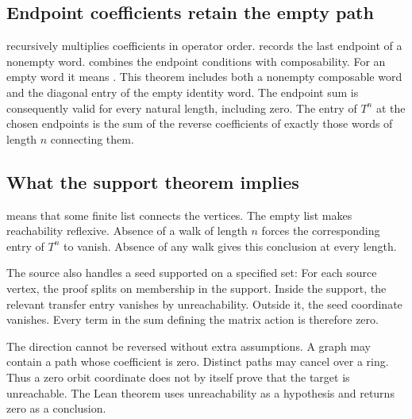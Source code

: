 \subsection{Endpoint coefficients retain the empty path}
 recursively multiplies coefficients in operator order.  records the last endpoint of a nonempty word.  combines the endpoint conditions with composability. For an empty word it means .
This theorem includes both a nonempty composable word and the diagonal entry of the empty identity word. The endpoint sum is consequently valid for every natural length, including zero. The entry of $T^n$ at the chosen endpoints is the sum of the reverse coefficients of exactly those words of length $n$ connecting them.

\subsection{What the support theorem implies}
 means that some finite list connects the vertices. The empty list makes reachability reflexive. Absence of a walk of length $n$ forces the corresponding entry of $T^n$ to vanish. Absence of any walk gives this conclusion at every length.

The source also handles a seed supported on a specified set:
For each source vertex, the proof splits on membership in the support. Inside the support, the relevant transfer entry vanishes by unreachability. Outside it, the seed coordinate vanishes. Every term in the sum defining the matrix action is therefore zero.

The direction cannot be reversed without extra assumptions. A graph may contain a path whose coefficient is zero. Distinct paths may cancel over a ring. Thus a zero orbit coordinate does not by itself prove that the target is unreachable. The Lean theorem uses unreachability as a hypothesis and returns zero as a conclusion.
